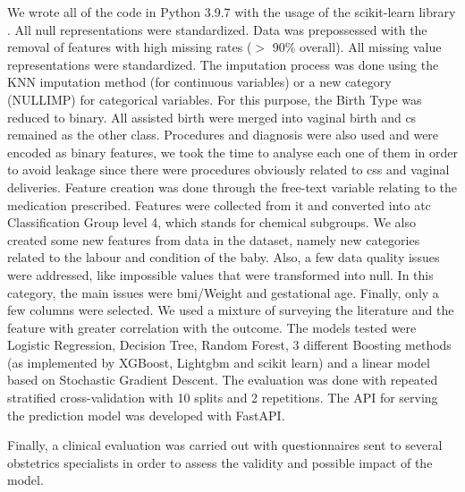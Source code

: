 We wrote all of the code in Python 3.9.7 with the usage of the scikit-learn library \cite{scikit-learn}. All null representations were standardized. Data was prepossessed with the removal of features with high missing rates ($>$ 90\% overall). All missing value representations were standardized. The imputation process was done using the KNN imputation method (for continuous variables) or a new category (NULLIMP) for categorical variables. 
For this purpose, the Birth Type was reduced to binary. All assisted birth were merged into vaginal birth and \ac{cs} remained as the other class. Procedures and diagnosis were also used and were encoded as binary features, we took the time to analyse each one of them in order to avoid leakage since there were procedures obviously related to \acp{cs} and vaginal deliveries.
Feature creation was done through the free-text variable relating to the medication prescribed. Features were collected from it and converted into \ac{atc} Classification Group level 4, which stands for chemical subgroups. We also created some new features from data in the dataset, namely new categories related to the labour and condition of the baby.
Also, a few data quality issues were addressed, like impossible values that were transformed into null. In this category, the main issues were \ac{bmi}/Weight and gestational age.
Finally, only a few columns were selected. We used a mixture of surveying the literature and the feature with greater correlation with the outcome.
The models tested were Logistic Regression, Decision Tree, Random Forest, 3 different Boosting methods (as implemented by XGBoost, Lightgbm and scikit learn) and a linear model based on Stochastic Gradient Descent.
The evaluation was done with repeated stratified cross-validation with 10 splits and 2 repetitions.
The API for serving the prediction model was developed with FastAPI.

Finally, a clinical evaluation was carried out with questionnaires sent to several obstetrics specialists in order to assess the validity and possible impact of the model.
